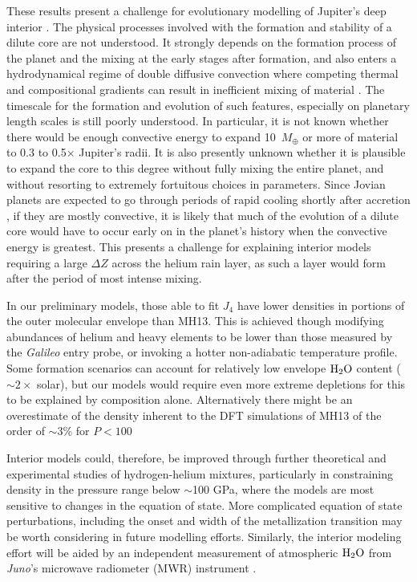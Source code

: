 These results present a challenge for evolutionary modelling of Jupiter's deep
interior  \citep[e.g.][]{vazan2016,mankovich2016}.  The physical processes
involved with the formation and stability of a dilute core are not understood.
It strongly depends on the formation process of the planet and the mixing at
the early stages after formation, and also enters a hydrodynamical regime of
double diffusive convection where competing thermal and compositional gradients
can result in inefficient mixing of material \citep{Leconte2012,Mirouh2012}.
The timescale for the formation and evolution of such features, especially on
planetary length scales is still poorly understood.  In particular, it is not
known whether there would be enough convective energy to expand 10~$M_\oplus$
or more of material to 0.3 to 0.5$\times$ Jupiter's radii. It is also presently
unknown whether it is plausible to expand the core to this degree without fully
mixing the entire planet, and without resorting to extremely fortuitous choices
in parameters.  Since Jovian planets are expected to go through periods of
rapid cooling shortly after accretion \citep{Fortney2010}, if they are mostly
convective, it is likely that much of the evolution of a dilute core would
have to occur early on in the planet's history when the convective energy is
greatest. This presents a challenge for explaining interior models requiring a
large $\Delta Z$ across the helium rain layer, as such a layer would form after the
period of most intense mixing.

In our preliminary models, those able to fit $J_4$ have lower densities in
portions of the outer molecular envelope than MH13. This is achieved though
modifying abundances of helium and heavy elements to be lower than those measured by
the \textit{Galileo} entry probe, or invoking a hotter non-adiabatic
temperature profile. Some formation scenarios \citep[e.g.][]{Mousis2012} can
account for relatively low envelope ${\rm H}_2{\rm O}$ content ($\sim2\times$
solar), but our models would require even more extreme depletions for this
to be explained by composition alone.  Alternatively there might be an
overestimate of the density inherent to the DFT simulations of MH13 of the
order of $\sim$3\% for $P<100$

Interior models could, therefore, be improved through further theoretical and
experimental studies of hydrogen-helium mixtures, particularly in constraining
density in the pressure range below $\sim$100 GPa, where the models are most
sensitive to changes in the equation of state. More complicated equation of state
perturbations, including the onset and width of the metallization transition
\citep{Knudson2017} may be worth considering in future modelling efforts.
Similarly, the interior modeling effort will be aided by an independent
measurement of atmospheric ${\rm H}_2{\rm O}$ from \textit{Juno}'s microwave
radiometer (MWR) instrument \citep{helled2014b}.

